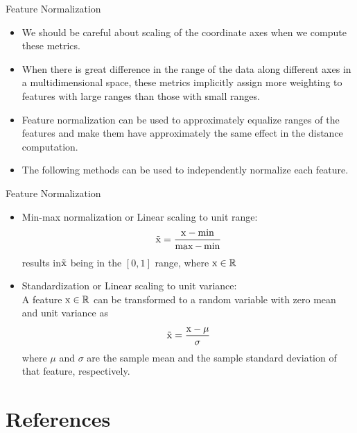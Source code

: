\begin{frame}{Feature Normalization}
\begin{itemize}
\item We should be careful about scaling of the coordinate axes when we compute these metrics.
􏰂\item When there is great difference in the range of the data along different axes in a multidimensional space, these metrics implicitly assign more weighting to features with large ranges than those with small ranges.
􏰂\item {\color{mycolor2}Feature normalization} can be used to approximately equalize ranges of the features and make them have approximately the same effect in the distance computation.
􏰂\item The following methods can be used to independently normalize each feature.
\end{itemize}
\end{frame}

\begin{frame}{Feature Normalization}
\begin{itemize}
\item {\color{mycolor2}Min-max normalization} or Linear scaling to unit range:\\
\[\tilde{\rm x} = \frac{{{\rm x} - \min }}{{\max  - \min }}\]
results in$ \tilde{\rm x}$ being in the $[0,1]$ range, where ${\rm x}\in \mathbb{R}$
\item  {\color{mycolor2}Standardization} or Linear scaling to unit variance:\\
A feature ${\rm x}\in \mathbb{R}$ can be transformed to a random variable with zero mean and unit variance as
\[\tilde{\rm x} = \frac{{{\rm x} - \mu }}{\sigma }\]
where $\mu$ and $\sigma$ are the sample mean and the sample standard deviation of that feature, respectively.
\end{itemize}
\end{frame}





\section{References}
